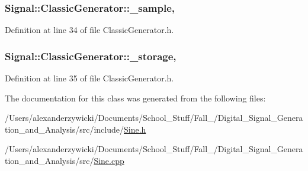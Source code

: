 \hypertarget{class_signal_1_1_classic_generator_a40313d0d806d6e44af7d41b3ef3a0822}{
\subsubsection[{\+\_\+sample}]{ Signal\+::\+Classic\+Generator\+::\+\_\+sample\hspace{0.3cm}{\ttfamily [protected]}, {\ttfamily [inherited]}}}\label{class_signal_1_1_classic_generator_a40313d0d806d6e44af7d41b3ef3a0822}


Definition at line 34 of file Classic\+Generator.\+h.

\hypertarget{class_signal_1_1_classic_generator_a1214faf589eccb01631700723900bbf9}{
\subsubsection[{\+\_\+storage}]{ Signal\+::\+Classic\+Generator\+::\+\_\+storage\hspace{0.3cm}{\ttfamily [protected]}, {\ttfamily [inherited]}}}\label{class_signal_1_1_classic_generator_a1214faf589eccb01631700723900bbf9}


Definition at line 35 of file Classic\+Generator.\+h.



The documentation for this class was generated from the following files\+:\begin{DoxyCompactItemize}
\item 
/\+Users/alexanderzywicki/\+Documents/\+School\+\_\+\+Stuff/\+Fall\+\_/\+Digital\+\_\+\+Signal\+\_\+\+Generation\+\_\+and\+\_\+\+Analysis/src/include/\hyperlink{_sine_8h}{Sine.\+h}\item 
/\+Users/alexanderzywicki/\+Documents/\+School\+\_\+\+Stuff/\+Fall\+\_/\+Digital\+\_\+\+Signal\+\_\+\+Generation\+\_\+and\+\_\+\+Analysis/src/\hyperlink{_sine_8cpp}{Sine.\+cpp}\end{DoxyCompactItemize}
